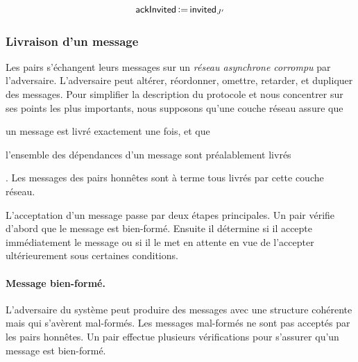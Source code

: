 \begin{equation*}
    \operatorname{\mathsf{ackInvited}} \operatorname{\vcentcolon=} \operatorname{\mathsf{invited}}_{J'}
\end{equation*}


\subsubsection{Livraison d'un message}





Les pairs s'échangent leurs messages sur un \emph{réseau asynchrone corrompu} par l'adversaire.
L'adversaire peut altérer, réordonner, omettre, retarder, et dupliquer des messages.
Pour simplifier la description du protocole et nous concentrer sur ses points les plus importants, nous supposons qu'une couche réseau assure que \begin{inlinelist}\item un message est livré exactement une fois, et que \item l'ensemble des dépendances d'un message sont préalablement livrés\end{inlinelist}.
Les messages des pairs honnêtes sont à terme tous livrés par cette couche réseau.

L'acceptation d'un message passe par deux étapes principales.
Un pair vérifie d'abord que le message est bien-formé.
Ensuite il détermine si il accepte immédiatement le message ou si il le met en attente en vue de l'accepter ultérieurement sous certaines conditions.


\paragraph{Message bien-formé.} L'adversaire du système peut produire des messages avec une structure cohérente mais qui s'avèrent mal-formés.
Les messages mal-formés ne sont pas acceptés par les pairs honnêtes.
Un pair effectue plusieurs vérifications pour s'assurer qu'un message est bien-formé.

